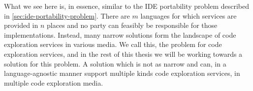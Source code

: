 What we see here is, in essence, similar to the IDE portability problem described in \cref{sec:ide-portability-problem}.
There are $m$ languages for which services are provided in $n$ places and no party can feasibly be responsible for those \problem{\times} implementations.
Instead, many narrow solutions form the landscape of code exploration services in various media.
We call this, the \problem{\times} problem for code exploration services, and in the rest of this thesis we will be working towards a solution for this problem.
A solution which is not as narrow and can, in a language-agnostic manner support multiple kinds code exploration services, in multiple code exploration media.



%
%
%
%
%
%
